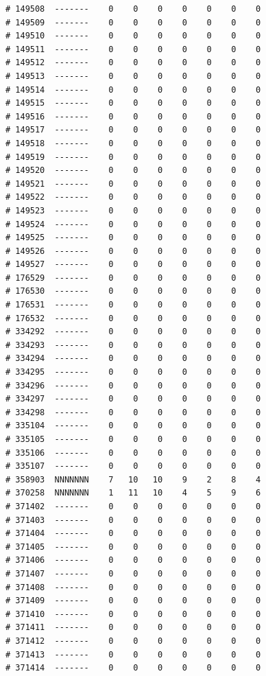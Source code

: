 \documentclass{article}\usepackage[]{graphicx}\usepackage[]{color}
\makeatletter
\newenvironment{kframe}{%
 \def\at@end@of@kframe{}%
 \ifinner\ifhmode%
  \def\at@end@of@kframe{\end{minipage}}%
  \begin{minipage}{\columnwidth}%
 \fi\fi%
 \def\FrameCommand##1{\hskip\@totalleftmargin \hskip-\fboxsep
 \colorbox{shadecolor}{##1}\hskip-\fboxsep
     \hskip-\linewidth \hskip-\@totalleftmargin \hskip\columnwidth}%
 \MakeFramed {\advance\hsize-\width
   \@totalleftmargin\z@ \linewidth\hsize
   \@setminipage}}%
 {\par\unskip\endMakeFramed%
 \at@end@of@kframe}
\newenvironment{knitrout}{}{} %
\makeatother
\begin{document}
\begin{knitrout}
\begin{kframe}
\begin{verbatim}
# 149508  -------    0    0    0    0    0    0    0
# 149509  -------    0    0    0    0    0    0    0
# 149510  -------    0    0    0    0    0    0    0
# 149511  -------    0    0    0    0    0    0    0
# 149512  -------    0    0    0    0    0    0    0
# 149513  -------    0    0    0    0    0    0    0
# 149514  -------    0    0    0    0    0    0    0
# 149515  -------    0    0    0    0    0    0    0
# 149516  -------    0    0    0    0    0    0    0
# 149517  -------    0    0    0    0    0    0    0
# 149518  -------    0    0    0    0    0    0    0
# 149519  -------    0    0    0    0    0    0    0
# 149520  -------    0    0    0    0    0    0    0
# 149521  -------    0    0    0    0    0    0    0
# 149522  -------    0    0    0    0    0    0    0
# 149523  -------    0    0    0    0    0    0    0
# 149524  -------    0    0    0    0    0    0    0
# 149525  -------    0    0    0    0    0    0    0
# 149526  -------    0    0    0    0    0    0    0
# 149527  -------    0    0    0    0    0    0    0
# 176529  -------    0    0    0    0    0    0    0
# 176530  -------    0    0    0    0    0    0    0
# 176531  -------    0    0    0    0    0    0    0
# 176532  -------    0    0    0    0    0    0    0
# 334292  -------    0    0    0    0    0    0    0
# 334293  -------    0    0    0    0    0    0    0
# 334294  -------    0    0    0    0    0    0    0
# 334295  -------    0    0    0    0    0    0    0
# 334296  -------    0    0    0    0    0    0    0
# 334297  -------    0    0    0    0    0    0    0
# 334298  -------    0    0    0    0    0    0    0
# 335104  -------    0    0    0    0    0    0    0
# 335105  -------    0    0    0    0    0    0    0
# 335106  -------    0    0    0    0    0    0    0
# 335107  -------    0    0    0    0    0    0    0
# 358903  NNNNNNN    7   10   10    9    2    8    4
# 370258  NNNNNNN    1   11   10    4    5    9    6
# 371402  -------    0    0    0    0    0    0    0
# 371403  -------    0    0    0    0    0    0    0
# 371404  -------    0    0    0    0    0    0    0
# 371405  -------    0    0    0    0    0    0    0
# 371406  -------    0    0    0    0    0    0    0
# 371407  -------    0    0    0    0    0    0    0
# 371408  -------    0    0    0    0    0    0    0
# 371409  -------    0    0    0    0    0    0    0
# 371410  -------    0    0    0    0    0    0    0
# 371411  -------    0    0    0    0    0    0    0
# 371412  -------    0    0    0    0    0    0    0
# 371413  -------    0    0    0    0    0    0    0
# 371414  -------    0    0    0    0    0    0    0

\end{verbatim}
\end{kframe}
\end{knitrout}
\end{document}
